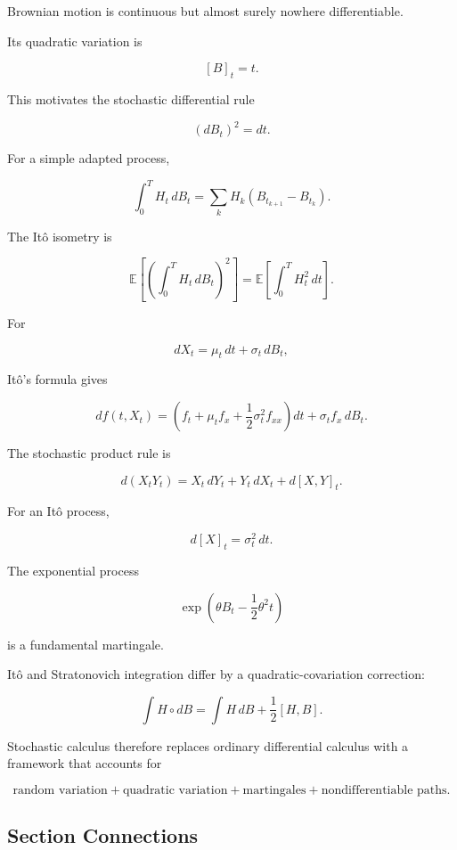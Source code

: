 Brownian motion is continuous but almost surely nowhere differentiable.

Its quadratic variation is

\[
\boxed{
[B]_t=t.
}
\]

This motivates the stochastic differential rule

\[
\boxed{
(dB_t)^2=dt.
}
\]

For a simple adapted process,

\[
\boxed{
\int_0^T
H_t\,dB_t
=
\sum_k
H_k
(B_{t_{k+1}}-B_{t_k}).
}
\]

The It\^o isometry is

\[
\boxed{
\mathbb{E}
\left[
\left(
\int_0^T
H_t\,dB_t
\right)^2
\right]
=
\mathbb{E}
\left[
\int_0^T
H_t^2\,dt
\right].
}
\]

For

\[
dX_t
=
\mu_t\,dt
+
\sigma_t\,dB_t,
\]

It\^o's formula gives

\[
\boxed{
df(t,X_t)
=
\left(
f_t
+
\mu_tf_x
+
\frac12\sigma_t^2f_{xx}
\right)dt
+
\sigma_tf_x\,dB_t.
}
\]

The stochastic product rule is

\[
\boxed{
d(X_tY_t)
=
X_t\,dY_t
+
Y_t\,dX_t
+
d[X,Y]_t.
}
\]

For an It\^o process,

\[
\boxed{
d[X]_t
=
\sigma_t^2\,dt.
}
\]

The exponential process

\[
\boxed{
\exp
\left(
\theta B_t
-
\frac12\theta^2t
\right)
}
\]

is a fundamental martingale.

It\^o and Stratonovich integration differ by a quadratic-covariation
correction:

\[
\boxed{
\int H\circ dB
=
\int H\,dB
+
\frac12[H,B].
}
\]

Stochastic calculus therefore replaces ordinary differential calculus
with a framework that accounts for

\[
\boxed{
\text{random variation}
+
\text{quadratic variation}
+
\text{martingales}
+
\text{nondifferentiable paths}.
}
\]

\subsection{Section Connections}
\label{subsec:stochastic-calculus-connections}

